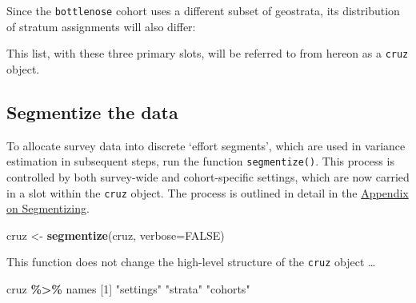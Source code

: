 \documentclass[
]{book}
\newenvironment{Shaded}{\begin{snugshade}}{\end{snugshade}}
\newcommand{\AttributeTok}[1]{\textcolor[rgb]{0.13,0.29,0.53}{#1}}
\newcommand{\ConstantTok}[1]{\textcolor[rgb]{0.56,0.35,0.01}{#1}}
\newcommand{\DecValTok}[1]{\textcolor[rgb]{0.00,0.00,0.81}{#1}}
\newcommand{\FunctionTok}[1]{\textcolor[rgb]{0.13,0.29,0.53}{\textbf{#1}}}
\newcommand{\NormalTok}[1]{#1}
\newcommand{\OtherTok}[1]{\textcolor[rgb]{0.56,0.35,0.01}{#1}}
\newcommand{\SpecialCharTok}[1]{\textcolor[rgb]{0.81,0.36,0.00}{\textbf{#1}}}
\newcommand{\StringTok}[1]{\textcolor[rgb]{0.31,0.60,0.02}{#1}}
\begin{document}
Since the \texttt{bottlenose} cohort uses a different subset of geostrata, its distribution of stratum assignments will also differ:

\begin{Shaded}
\end{Shaded}

This list, with these three primary slots, will be referred to from hereon as a \texttt{cruz} object.

\hypertarget{segmentize-the-data}{%
\subsection*{Segmentize the data}\label{segmentize-the-data}}

To allocate survey data into discrete `effort segments', which are used in variance estimation in subsequent steps, run the function \texttt{segmentize()}. This process is controlled by both survey-wide and cohort-specific \protect\hypertarget{settings}{}{settings}, which are now carried in a slot within the \texttt{cruz} object. The process is outlined in detail in the \protect\hyperlink{segmentizing}{Appendix on Segmentizing}.

\begin{Shaded}
\begin{Highlighting}[]
\NormalTok{cruz }\OtherTok{\textless{}{-}} \FunctionTok{segmentize}\NormalTok{(cruz, }\AttributeTok{verbose=}\ConstantTok{FALSE}\NormalTok{)}
\end{Highlighting}
\end{Shaded}

This function does not change the high-level structure of the \texttt{cruz} object \ldots{}

\begin{Shaded}
\begin{Highlighting}[]
\NormalTok{cruz }\SpecialCharTok{\%\textgreater{}\%}\NormalTok{ names}
\NormalTok{[}\DecValTok{1}\NormalTok{] }\StringTok{"settings"} \StringTok{"strata"}   \StringTok{"cohorts"} 
\end{Highlighting}
\end{Shaded}
\end{document}
